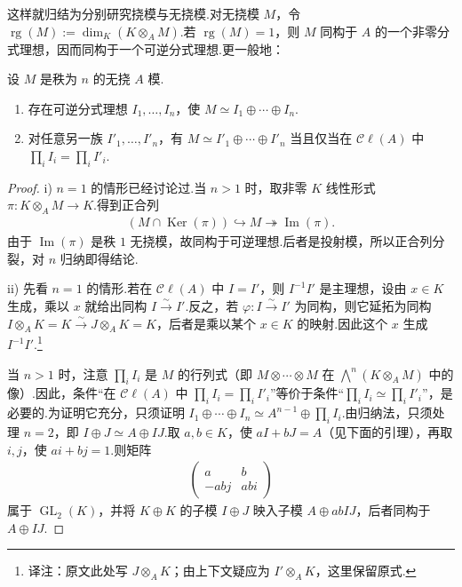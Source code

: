 这样就归结为分别研究挠模与无挠模.对无挠模 $M$，令 $\operatorname{rg}(M):=\dim_K(K\otimes_A M)$.若 $\operatorname{rg}(M)=1$，则 $M$ 同构于 $A$ 的一个非零分式理想，因而同构于一个可逆分式理想.更一般地：
\begin{proposition*}
设 $M$ 是秩为 $n$ 的无挠 $A$ 模.
\begin{enumerate}[label=\roman*)]
\item 存在可逆分式理想 $I_1,\ldots,I_n$，使 $M\simeq I_1\oplus\cdots\oplus I_n$.
\item 对任意另一族 $I'_1,\ldots,I'_n$，有 $M\simeq I'_1\oplus\cdots\oplus I'_n$ 当且仅当在 $\mathcal C\ell(A)$ 中 $\prod_iI_i=\prod_iI'_i$.
\end{enumerate}
\end{proposition*}
\begin{proof}
i) $n=1$ 的情形已经讨论过.当 $n>1$ 时，取非零 $K$ 线性形式 $\pi\colon K\otimes_A M\longrightarrow K$.得到正合列
\begin{align*}
(M\cap\operatorname{Ker}(\pi))\hookrightarrow M\twoheadrightarrow\operatorname{Im}(\pi).
\end{align*}
由于 $\operatorname{Im}(\pi)$ 是秩 $1$ 无挠模，故同构于可逆理想.后者是投射模，所以正合列分裂，对 $n$ 归纳即得结论.

ii) 先看 $n=1$ 的情形.若在 $\mathcal C\ell(A)$ 中 $I=I'$，则 $I^{-1}I'$ 是主理想，设由 $x\in K$ 生成，乘以 $x$ 就给出同构 $I\xrightarrow{\sim}I'$.反之，若 $\varphi\colon I\xrightarrow{\sim}I'$ 为同构，则它延拓为同构 $I\otimes_A K=K\xrightarrow{\sim}J\otimes_A K=K$，后者是乘以某个 $x\in K$ 的映射.因此这个 $x$ 生成 $I^{-1}I'$.\footnote{译注：原文此处写 $J\otimes_A K$；由上下文疑应为 $I'\otimes_A K$，这里保留原式.}

当 $n>1$ 时，注意 $\prod_iI_i$ 是 $M$ 的行列式（即 $M\otimes\cdots\otimes M$ 在 $\bigwedge^n(K\otimes_A M)$ 中的像）.因此，条件``在 $\mathcal C\ell(A)$ 中 $\prod_iI_i=\prod_iI'_i$''等价于条件``$\prod_iI_i\simeq\prod_iI'_i$''，是必要的.为证明它充分，只须证明 $I_1\oplus\cdots\oplus I_n\simeq A^{n-1}\oplus\prod_iI_i$.由归纳法，只须处理 $n=2$，即 $I\oplus J\simeq A\oplus IJ$.取 $a,b\in K$，使 $aI+bJ=A$（见下面的引理），再取 $i,j$，使 $ai+bj=1$.则矩阵
\begin{align*}
\begin{pmatrix}a&b\\-abj&abi\end{pmatrix}
\end{align*}
属于 $\operatorname{GL}_2(K)$，并将 $K\oplus K$ 的子模 $I\oplus J$ 映入子模 $A\oplus abIJ$，后者同构于 $A\oplus IJ$.
\end{proof}
